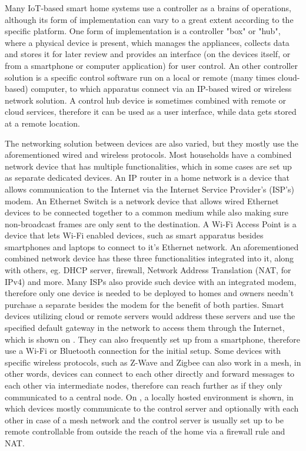 
Many IoT-based smart home systems use a controller as a brains of operations, although its form of implementation can vary to a great extent according to the specific platform. One form of implementation is a controller "box" or "hub", where a physical device is present, which manages the appliances, collects data and stores it for later review and provides an interface (on the devices itself, or from a smartphone or computer application) for user control. An other controller solution is a specific control software run on a local or remote (many times cloud-based) computer, to which apparatus connect via an IP-based wired or wireless network solution. A control hub device is sometimes combined with remote or cloud services, therefore it can be used as a user interface, while data gets stored at a remote location.

The networking solution between devices are also varied, but they mostly use the aforementioned wired and wireless protocols. Most households have a combined network device that has multiple functionalities, which in some cases are set up as separate dedicated devices. An IP router in a home network is a device that allows communication to the Internet via the Internet Service Provider's (ISP's) modem. An Ethernet Switch is a network device that allows wired Ethernet devices to be connected together to a common medium while also making sure non-broadcast frames are only sent to the destination. A Wi-Fi Access Point is a device that lets Wi-Fi enabled devices, such as smart apparatus besides smartphones and laptops to connect to it's Ethernet network. An aforementioned combined network device has these three functionalities integrated into it, along with others, eg. DHCP server, firewall, Network Address Translation (NAT, for IPv4) and more. Many ISPs also provide such device with an integrated modem, therefore only one device is needed to be deployed to homes and owners needn't purchase a separate besides the modem for the benefit of both parties. Smart devices utilizing cloud or remote servers would address these servers and use the specified default gateway in the network to access them through the Internet, which is shown on . They can also frequently set up from a smartphone, therefore use a Wi-Fi or Bluetooth connection for the initial setup. Some devices with specific wireless protocols, such as Z-Wave and Zigbee can also work in a mesh, in other words, devices can connect to each other directly and forward messages to each other via intermediate nodes, therefore can reach further as if they only communicated to a central node. On , a locally hosted environment is shown, in which devices mostly communicate to the control server and optionally with each other in case of a mesh network and the control server is usually set up to be remote controllable from outside the reach of the home via a firewall rule and NAT.

